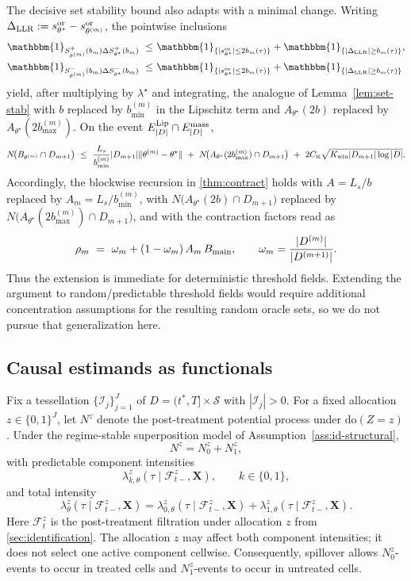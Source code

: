 \documentclass{statsoc}
\newcommand{\1}{\mathbbm{1}}
\newcommand{\CovX}{\mathbf{X}}
\newcommand{\Nproc}{N}
\newcommand{\Nzero}{N_0}
\newcommand{\None}{N_1}
\begin{document}
The decisive set stability bound also adapts with a minimal change. Writing \(\Delta_{\rm LLR}:=s^{\rm or}_{\theta^\star}-s^{\rm or}_{\theta^{(m)}}\), the pointwise inclusions
\begin{align*}
\1_{S_{\theta^{(m)}}^+(b_m) \Delta S_{\theta^\star}^+(b_m)}\ \le&\ \1_{\{|s^{\rm or}_{\theta^\star}|\le 2b_m(\tau)\}}+\1_{\{|\Delta_{\rm LLR}|\ge b_m(\tau)\}},\\
\1_{S_{\theta^{(m)}}^-(b_m) \Delta S_{\theta^\star}^-(b_m)}\ \le&\ \1_{\{|s^{\rm or}_{\theta^\star}|\le 2b_m(\tau)\}}+\1_{\{|\Delta_{\rm LLR}|\ge b_m(\tau)\}}
\end{align*}
yield, after multiplying by \(\lambda^\star\) and integrating, the analogue of Lemma~\ref{lem:set-stab} with \(b\) replaced by \(b_{\min}^{(m)}\) in the Lipschitz term and \(A_{\theta^\star}(2b)\) replaced by \(A_{\theta^\star}(2b_{\max}^{(m)})\). On the event \(E^{\rm Lip}_{|D|}\cap E^{\rm mass}_{|D|}\),
\[
N\!\big(B_{\theta^{(m)}}\cap D_{m+1}\big)\ \le\ \frac{L_s}{b_{\min}^{(m)}} |D_{m+1}| \|\theta^{(m)}-\theta^\star\|
\ +\ N\!\big(A_{\theta^\star}(2b_{\max}^{(m)})\cap D_{m+1}\big)\ +\ 2 C_{\rm it}\sqrt{K_{\rm win}|D_{m+1}|\log|D|}.
\]
Accordingly, the blockwise recursion in \cref{thm:contract} holds with \(A=L_s/b\) replaced by \(A_m=L_s/b_{\min}^{(m)}\),
with \(N\!\big(A_{\theta^\star}(2b)\cap D_{m+1}\big)\) replaced by \(N\!\big(A_{\theta^\star}(2b_{\max}^{(m)})\cap D_{m+1}\big)\),
and with the contraction factors read as
\[
\rho_m\ =\ \omega_m+(1-\omega_m)\,A_m\,B_{\rm main},
\qquad \omega_m=\frac{|D^{(m)}|}{|D^{(m+1)}|}.
\]
Thus the extension is immediate for deterministic threshold fields. Extending the argument to random/predictable threshold fields would require additional concentration assumptions for the resulting random oracle sets, so we do not pursue that generalization here.


\subsection{Causal estimands as functionals}
\label{sec:functional-transfer}

Fix a tessellation $\{\mathcal I_j\}_{j=1}^J$ of \(D=(t^\ast,T]\times\mathcal S\) with \(|\mathcal I_j|>0\).
For a fixed allocation \(z\in\{0,1\}^J\), let \(\Nproc^z\) denote the post-treatment potential process under \(\mathrm{do}(Z=z)\). Under the regime-stable superposition model of Assumption~\ref{ass:id-structural},
\[
\Nproc^z=\Nzero^z+\None^z,
\]
with predictable component intensities
\[
\lambda_{k,\theta}^z(\tau\mid \mathcal F_{t-}^z,\CovX),\qquad k\in\{0,1\},
\]
and total intensity
\[
\lambda_\theta^z(\tau\mid \mathcal F_{t-}^z,\CovX)
=
\lambda_{0,\theta}^z(\tau\mid \mathcal F_{t-}^z,\CovX)
+
\lambda_{1,\theta}^z(\tau\mid \mathcal F_{t-}^z,\CovX).
\]
Here \(\mathcal F_t^z\) is the post-treatment filtration under allocation \(z\) from \cref{sec:identification}. The allocation \(z\) may affect both component intensities; it does not select one active component cellwise. Consequently, spillover allows \(\Nzero^z\)-events to occur in treated cells and \(\None^z\)-events to occur in untreated cells.
\end{document}
